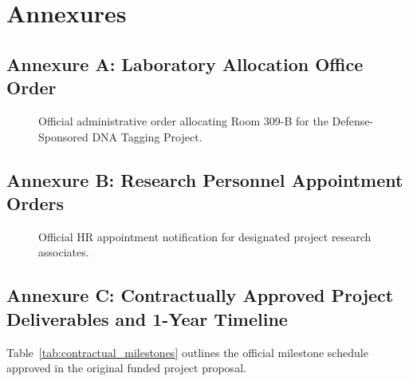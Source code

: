 \chapter*{Annexures}

\section*{Annexure A: Laboratory Allocation Office Order}
\begin{figure}[H]
    \centering
    \caption*{Official administrative order allocating Room 309-B for the Defense-Sponsored DNA Tagging Project.}
\end{figure}

\clearpage

\section*{Annexure B: Research Personnel Appointment Orders}
\begin{figure}[H]
    \centering
    \caption*{Official HR appointment notification for designated project research associates.}
\end{figure}

\clearpage

\section*{Annexure C: Contractually Approved Project Deliverables and 1-Year Timeline}
Table~\ref{tab:contractual_milestones} outlines the official milestone schedule approved in the original funded project proposal.

